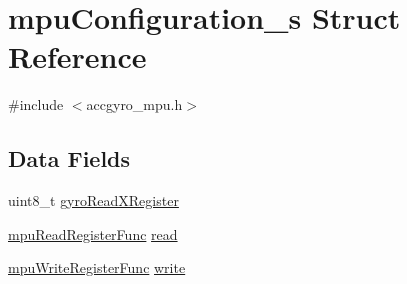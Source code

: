 \hypertarget{structmpuConfiguration__s}{\section{mpu\+Configuration\+\_\+s Struct Reference}
\label{structmpuConfiguration__s}
}


{\ttfamily \#include $<$accgyro\+\_\+mpu.\+h$>$}

\subsection*{Data Fields}
\begin{DoxyCompactItemize}
\item 
uint8\+\_\+t \hyperlink{structmpuConfiguration__s_a910fbcafe44034a1cadd8eb183a9ec1c}{gyro\+Read\+X\+Register}
\item 
\hyperlink{accgyro__mpu_8h_ad99228f4ae2a79d7d9996f406ea16a02}{mpu\+Read\+Register\+Func} \hyperlink{structmpuConfiguration__s_ab5fd834d2be8ec55a4bb92ba10469369}{read}
\item 
\hyperlink{accgyro__mpu_8h_ac87a6f663b6ee645e820f1e4829825c3}{mpu\+Write\+Register\+Func} \hyperlink{structmpuConfiguration__s_a839a826e244157a65b8b185760e5f0e8}{write}
\end{DoxyCompactItemize}


